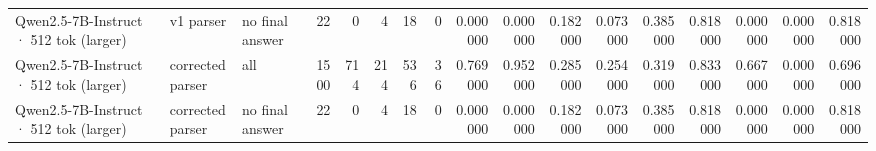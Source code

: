 \begin{table}
\begin{tabular}{lllrrrrrrrrrrrrrr}
Qwen2.5-7B-Instruct · 512 tok (larger) & v1 parser & no final answer & 22 & 0 & 4 & 18 & 0 & 0.000000 & 0.000000 & 0.182000 & 0.073000 & 0.385000 & 0.818000 & 0.000000 & 0.000000 & 0.818000 \\
Qwen2.5-7B-Instruct · 512 tok (larger) & corrected parser & all & 1500 & 714 & 214 & 536 & 36 & 0.769000 & 0.952000 & 0.285000 & 0.254000 & 0.319000 & 0.833000 & 0.667000 & 0.000000 & 0.696000 \\
Qwen2.5-7B-Instruct · 512 tok (larger) & corrected parser & no final answer & 22 & 0 & 4 & 18 & 0 & 0.000000 & 0.000000 & 0.182000 & 0.073000 & 0.385000 & 0.818000 & 0.000000 & 0.000000 & 0.818000 \\
\bottomrule
\end{tabular}
\end{table}
